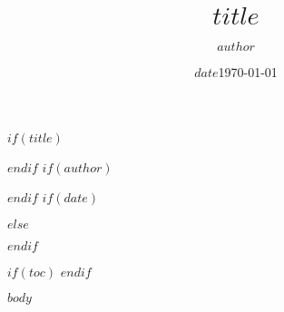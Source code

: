 \documentclass[$if(fontsize)$$fontsize$,$endif$$if(papersize)$$papersize$,$endif$12pt,a4paper]{article}
\begin{document}
$if(title)$
\title{\color{maritimeDarkBlue}$title$}
$endif$
$if(author)$
\author{$author$}
$endif$
$if(date)$
\date{$date$}
$else$
\date{\today}
$endif$

\maketitle

$if(toc)$
\tableofcontents
\clearpage
$endif$

$body$
\end{document}
